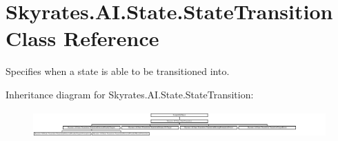 \hypertarget{class_skyrates_1_1_a_i_1_1_state_1_1_state_transition}{\section{Skyrates.\-A\-I.\-State.\-State\-Transition Class Reference}
\label{class_skyrates_1_1_a_i_1_1_state_1_1_state_transition}
}


Specifies when a state is able to be transitioned into.  


Inheritance diagram for Skyrates.\-A\-I.\-State.\-State\-Transition\-:\begin{figure}[H]
\begin{center}
\leavevmode
\includegraphics[height=1.054118cm]{class_skyrates_1_1_a_i_1_1_state_1_1_state_transition}
\end{center}
\end{figure}
